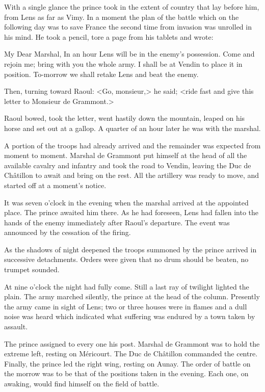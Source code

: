 With a single glance the prince took in the extent of country that lay before him, from Lens as far as Vimy. In a moment the plan of the battle which on the following day was to save France the second time from invasion was unrolled in his mind. He took a pencil, tore a page from his tablets and wrote:  
\begin{mail}{}{My Dear Marshal,}
	In an hour Lens will be in the enemy's possession. Come and rejoin me; bring with you the whole army. I shall be at Vendin to place it in position. To-morrow we shall retake Lens and beat the enemy.
	\end{mail}

Then, turning toward Raoul: <Go, monsieur,> he said; <ride fast and give this letter to Monsieur de Grammont.>

Raoul bowed, took the letter, went hastily down the mountain, leaped on his horse and set out at a gallop. A quarter of an hour later he was with the marshal.

A portion of the troops had already arrived and the remainder was expected from moment to moment. Marshal de Grammont put himself at the head of all the available cavalry and infantry and took the road to Vendin, leaving the Duc de Châtillon to await and bring on the rest. All the artillery was ready to move, and started off at a moment's notice.

It was seven o'clock in the evening when the marshal arrived at the appointed place. The prince awaited him there. As he had foreseen, Lens had fallen into the hands of the enemy immediately after Raoul's departure. The event was announced by the cessation of the firing.

As the shadows of night deepened the troops summoned by the prince arrived in successive detachments. Orders were given that no drum should be beaten, no trumpet sounded.

At nine o'clock the night had fully come. Still a last ray of twilight lighted the plain. The army marched silently, the prince at the head of the column. Presently the army came in sight of Lens; two or three houses were in flames and a dull noise was heard which indicated what suffering was endured by a town taken by assault.

The prince assigned to every one his post. Marshal de Grammont was to hold the extreme left, resting on Méricourt. The Duc de Châtillon commanded the centre. Finally, the prince led the right wing, resting on Aunay. The order of battle on the morrow was to be that of the positions taken in the evening. Each one, on awaking, would find himself on the field of battle.

